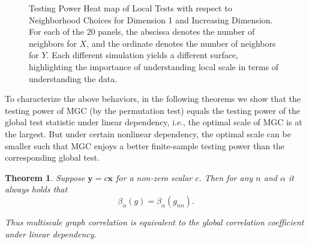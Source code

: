 \documentclass[11pt]{article}
\providecommand{\mb}[1]{\boldsymbol{#1}}
\newtheorem{thm}{Theorem}
\begin{document}
\begin{figure}[htbp]
\hfil
{}
\caption{Testing Power Heat map of Local Tests with respect to Neighborhood Choices for Dimension 1 and Increasing Dimension.
For each of the 20 panels, the abscissa denotes the number of neighbors for $X$, and the ordinate denotes the number of neighbors for $Y$.  Each different simulation yields a different surface, highlighting the importance of understanding local scale in terms of understanding the data.}
\label{figSim2}
\end{figure}

To characterize the above behaviors, in the following theorems we show that the testing power of MGC (by the permutation test) equals the testing power of the global test statistic under linear dependency, i.e., the optimal scale of MGC is at the largest. But under certain nonlinear dependency, the optimal scale can be smaller such that MGC enjoys a better finite-sample testing power than the corresponding global test. 

\begin{thm}
\label{thm2}
Suppose $\mb{y}=c\mb{x}$ for a non-zero scalar $c$. Then for any $n$ and $\alpha$ it always holds that
\begin{equation}
\beta_{\alpha}(g) = \beta_{\alpha}(g_{nn}).
\end{equation}

Thus multiscale graph correlation is equivalent to the global correlation coefficient under linear dependency.
\end{thm}
\end{document}
